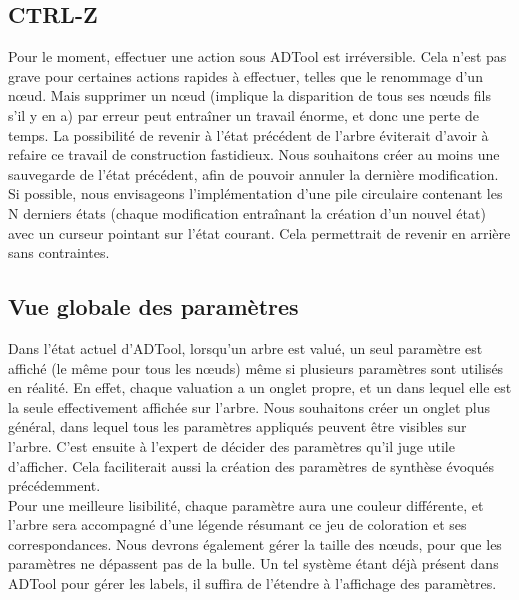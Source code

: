 	\subsection{CTRL-Z}
	
	Pour le moment, effectuer une action sous ADTool est irréversible. Cela n'est pas grave pour certaines actions rapides à effectuer, telles que le renommage d'un nœud. Mais supprimer un nœud (implique la disparition de tous ses nœuds fils s'il y en a) par erreur peut entraîner un travail énorme, et donc une perte de temps. La possibilité de revenir à l'état précédent de l'arbre éviterait d'avoir à refaire ce travail de construction fastidieux. Nous souhaitons créer au moins une sauvegarde de l'état précédent, afin de pouvoir annuler la dernière modification. Si possible, nous envisageons l'implémentation d'une pile circulaire contenant les N derniers états (chaque modification entraînant la création d'un nouvel état) avec un curseur pointant sur l'état courant. Cela permettrait de revenir en arrière sans contraintes. %

	\subsection{Vue globale des paramètres}
	
	Dans l'état actuel d'ADTool, lorsqu'un arbre est valué, un seul paramètre est affiché (le même pour tous les nœuds) même si plusieurs paramètres sont utilisés en réalité. En effet, chaque valuation a un onglet propre, et un dans lequel elle est la seule effectivement affichée sur l'arbre.%
	 Nous souhaitons créer un onglet plus général, dans lequel tous les paramètres appliqués peuvent être visibles sur l'arbre. C'est ensuite à l'expert de décider des paramètres qu'il juge utile d'afficher. Cela faciliterait aussi la création des paramètres de synthèse évoqués précédemment.\\
	
	Pour une meilleure lisibilité, chaque paramètre aura une couleur différente, et l'arbre sera accompagné d'une légende résumant ce jeu de coloration et ses correspondances. Nous devrons également gérer la taille des nœuds, pour que les paramètres ne dépassent pas de la bulle. Un tel système étant déjà présent dans ADTool pour gérer les labels, il suffira de l'étendre à l'affichage des paramètres.
